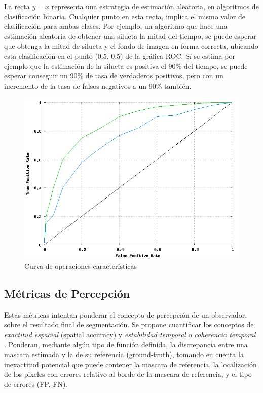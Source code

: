 La recta $y=x$ representa una estrategia de estimación aleatoria, en algoritmos de clasificación binaria. Cualquier punto en esta recta, implica el mismo valor de clasificación para ambas clases. Por ejemplo, un algoritmo que hace una estimación aleatoria de obtener una silueta la mitad del tiempo, se puede esperar que obtenga la mitad de silueta y el fondo de imagen en forma correcta, ubicando esta clasificación en el punto (0.5, 0.5) de la gráfica ROC. Sí se estima por ejemplo que la estimación de la silueta es positiva el 90\% del tiempo, se puede esperar conseguir un 90\% de tasa de verdaderos positivos, pero con un incremento de la tasa de falsos negativos a un 90\% también.




\begin{figure}[!ht]
\centering
\includegraphics[scale=0.5]{img/ch4/curva_operaciones_caracteristicas}
\caption{Curva de operaciones características}
\label{fig:tpr_fpr}
\end{figure}




\subsection{Métricas de Percepción}
\label{sub:metricas_percepcion}

Estas métricas intentan ponderar el concepto de percepción de un observador, sobre el resultado final de segmentación. Se propone cuantificar los conceptos de \emph{exactitud espacial} (spatial accuracy) y \emph{estabilidad temporal} \cite{liu_metrics_2011} \cite{cavallaro_objective_2002} o \emph{coherencia temporal} \cite{villegas_perceptually-weighted_2004}. Ponderan, mediante algún tipo de función definida, la discrepancia entre una mascara estimada y la de su referencia (ground-truth), tomando en cuenta la inexactitud potencial que puede contener la mascara de referencia, la localización de los pixeles con errores relativo al borde de la mascara de referencia, y el tipo de errores (FP, FN). 

